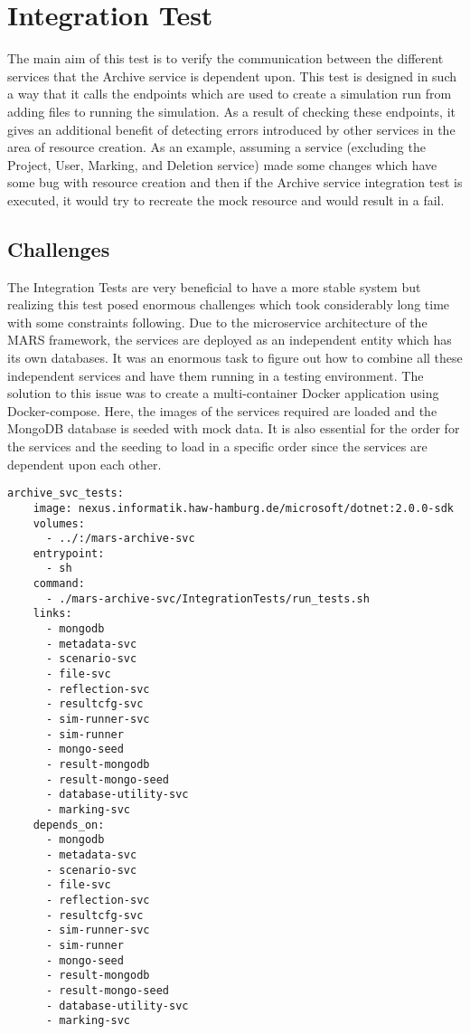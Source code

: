 \section{Integration Test}
The main aim of this test is to verify the communication between the different services that the Archive service is dependent upon. This test is designed in 
such a way that it calls the endpoints which are used to create a simulation run from adding files to running the simulation. As a result of checking
these endpoints, it gives an additional benefit of detecting errors introduced by other services in the area of resource creation. As an example, assuming a service
(excluding the Project, User, Marking, and Deletion service)
made some changes which have some bug with resource creation and then if the Archive service integration test is executed, it would try to recreate the mock resource
and would result in a fail.

\subsection{Challenges}
The Integration Tests are very beneficial to have a more stable system but realizing this test posed enormous challenges which took considerably long time 
with some constraints following. Due to the microservice architecture of the MARS framework, the services are deployed as an independent entity which has its own databases.
It was an enormous task to figure out how to combine all these independent services and have them running in a testing environment. The solution to this issue
was to create a multi-container Docker application using Docker-compose. Here, the images of the services required are loaded and the MongoDB database 
is seeded with mock data. It is also essential for the order for the services and the seeding to load in a specific order since the services are dependent upon
each other.  

\begin{lstlisting}[language=docker-compose,caption={Docker compose configuration snippet for Archive service Integration Test}, captionpos=b, breaklines=true,label={code:integCompose}]
archive_svc_tests:
    image: nexus.informatik.haw-hamburg.de/microsoft/dotnet:2.0.0-sdk
    volumes:
      - ../:/mars-archive-svc
    entrypoint:
      - sh
    command:
      - ./mars-archive-svc/IntegrationTests/run_tests.sh
    links:
      - mongodb
      - metadata-svc
      - scenario-svc
      - file-svc
      - reflection-svc
      - resultcfg-svc
      - sim-runner-svc
      - sim-runner
      - mongo-seed
      - result-mongodb
      - result-mongo-seed
      - database-utility-svc
      - marking-svc
    depends_on:
      - mongodb
      - metadata-svc
      - scenario-svc
      - file-svc
      - reflection-svc
      - resultcfg-svc
      - sim-runner-svc
      - sim-runner
      - mongo-seed
      - result-mongodb
      - result-mongo-seed
      - database-utility-svc
      - marking-svc
\end{lstlisting}      

